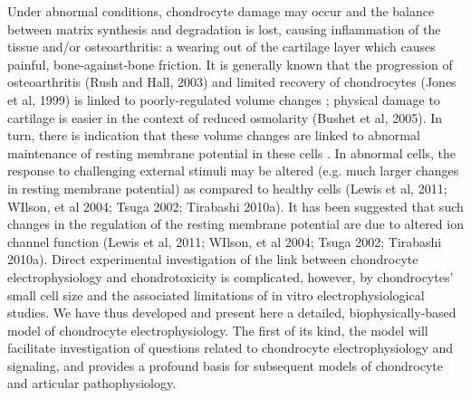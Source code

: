Under abnormal conditions, chondrocyte damage may occur
and the balance between matrix synthesis and degradation is lost,
causing inflammation of the tissue and/or osteoarthritis: a wearing
out of the cartilage layer which causes painful, bone-against-bone
friction. It is generally known that the progression of osteoarthritis (Rush and
Hall, 2003) and limited recovery of chondrocytes (Jones et al, 1999)
is linked to poorly-regulated volume changes \citep{Lewisetal2011};
physical damage to cartilage is easier in the context of reduced
osmolarity (Bushet et al, 2005).  In turn, there is indication that
these volume changes are linked to abnormal maintenance of resting
membrane potential in these cells \citep{Lewisetal2011}.  In abnormal
cells, the response to challenging external stimuli may be altered
(e.g. much larger changes in resting membrane potential) as compared to healthy cells (Lewis et al,
2011; WIlson, et al 2004; Tsuga 2002; Tirabashi 2010a).  It has been
suggested that such changes in the regulation of the resting membrane
potential are due to altered ion channel function (Lewis et al, 2011;
WIlson, et al 2004; Tsuga 2002; Tirabashi 2010a).  Direct experimental
investigation of the link between chondrocyte electrophysiology and
chondrotoxicity is complicated, however, by chondrocytes' small cell
size and the associated limitations of in vitro electrophysiological
studies. We have thus developed and present here a detailed,
biophysically-based model of chondrocyte electrophysiology.  The first
of its kind, the model will facilitate investigation of questions
related to chondrocyte electrophysiology and signaling, and provides a
profound basis for subsequent models of chondrocyte and articular
pathophysiology.

